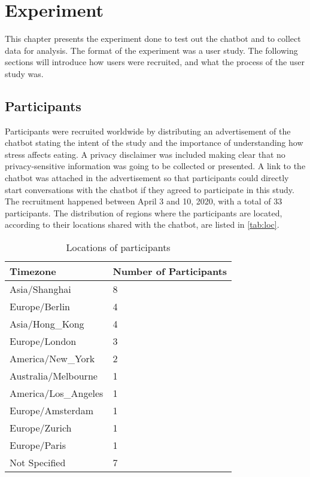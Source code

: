 
\chapter{Experiment}\label{chapter:experiment}
This chapter presents the experiment done to test out the chatbot and to collect data for analysis. The format of the experiment was a user study. The following sections will introduce how users were recruited, and what the process of the user study was.

\section{Participants}
Participants were recruited worldwide by distributing an advertisement of the chatbot stating the intent of the study and the importance of understanding how stress affects eating. A privacy disclaimer was included making clear that no privacy-sensitive information was going to be collected or presented. A link to the chatbot was attached in the advertisement so that participants could directly start conversations with the chatbot if they agreed to participate in this study. The recruitment happened between April 3 and 10, 2020, with a total of 33 participants. The distribution of regions where the participants are located, according to their locations shared with the chatbot, are listed in \autoref{tab:loc}.

\begin{table}[htpb]
  \caption[Locations of Participants]{Locations of participants}\label{tab:loc}
  \centering
  \begin{tabular}{l l}
    \toprule
      Timezone & Number of Participants \\
    \midrule
      Asia/Shanghai & 8 \\
      Europe/Berlin & 4 \\
      Asia/Hong\_Kong & 4 \\
      Europe/London & 3 \\
      America/New\_York & 2 \\
      Australia/Melbourne & 1 \\
      America/Los\_Angeles & 1 \\
      Europe/Amsterdam & 1 \\
      Europe/Zurich & 1 \\
      Europe/Paris & 1 \\
      Not Specified & 7 \\
    \bottomrule
  \end{tabular}
\end{table}

